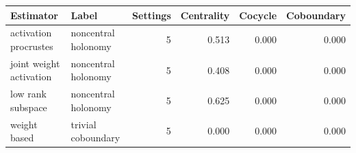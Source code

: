 \begin{tabular}{llrrrr}
\toprule
Estimator & Label & Settings & Centrality & Cocycle & Coboundary\\
\midrule
activation procrustes & noncentral holonomy & 5 & 0.513 & 0.000 & 0.000\\
joint weight activation & noncentral holonomy & 5 & 0.408 & 0.000 & 0.000\\
low rank subspace & noncentral holonomy & 5 & 0.625 & 0.000 & 0.000\\
weight based & trivial coboundary & 5 & 0.000 & 0.000 & 0.000\\
\bottomrule
\end{tabular}
